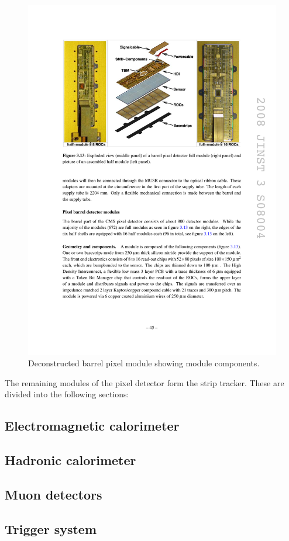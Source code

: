 \begin{figure}[tbh]
\centering
\includegraphics[width=5in]{figures/pixelmodule.pdf}
\caption{Deconstructed barrel pixel module showing module components.}
\label{fig:pixmodule}
\end{figure}

\indent The remaining modules of the pixel detector form the strip tracker. These are divided into the following sections: 

\subsection{Electromagnetic calorimeter}

\subsection{Hadronic calorimeter}

\subsection{Muon detectors}

\subsection{Trigger system}


